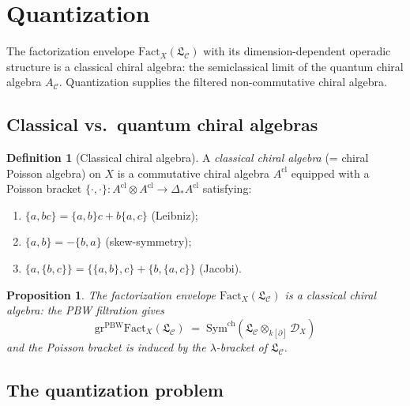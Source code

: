 \documentclass[11pt]{article}
\theoremstyle{plain}
\newtheorem{proposition}[theorem]{Proposition}
\theoremstyle{definition}
\newtheorem{definition}[theorem]{Definition}
\theoremstyle{remark}
\newcommand{\Sym}{\mathrm{Sym}}
\newcommand{\Fact}{\mathrm{Fact}}
\newcommand{\cC}{\mathcal{C}}
\newcommand{\cD}{\mathcal{D}}
\newcommand{\frakL}{\mathfrak{L}}
\begin{document}
\section{Quantization}
\label{sec:step4}

The factorization envelope $\Fact_X(\frakL_\cC)$ with its
dimension-dependent operadic structure is a classical chiral algebra:
the semiclassical limit of the quantum chiral algebra $A_\cC$.
Quantization supplies the filtered non-commutative chiral algebra.

\subsection{Classical vs.\ quantum chiral algebras}
\label{sec:classical-vs-quantum}

\begin{definition}[Classical chiral algebra]
\label{def:classical-chiral}
A \emph{classical chiral algebra} (= chiral Poisson algebra) on $X$ is a commutative chiral algebra $A^{\mathrm{cl}}$ equipped with a Poisson bracket $\{\cdot, \cdot\} \colon A^{\mathrm{cl}} \otimes A^{\mathrm{cl}} \to \Delta_* A^{\mathrm{cl}}$ satisfying:
\begin{enumerate}[label=(\roman*)]
\item $\{a, bc\} = \{a, b\}c + b\{a, c\}$ (Leibniz);
\item $\{a, b\} = -\{b, a\}$ (skew-symmetry);
\item $\{a, \{b, c\}\} = \{\{a, b\}, c\} + \{b, \{a, c\}\}$ (Jacobi).
\end{enumerate}
\end{definition}

\begin{proposition}
\label{prop:fact-envelope-classical}
The factorization envelope $\Fact_X(\frakL_\cC)$ is a classical chiral algebra: the PBW filtration gives
\[
\mathrm{gr}^{\mathrm{PBW}} \Fact_X(\frakL_\cC) \;=\; \Sym^{\mathrm{ch}}(\frakL_\cC \otimes_{k[\partial]} \cD_X)
\]
and the Poisson bracket is induced by the $\lambda$-bracket of $\frakL_\cC$.
\end{proposition}

\subsection{The quantization problem}
\label{sec:quant-problem}
\end{document}
